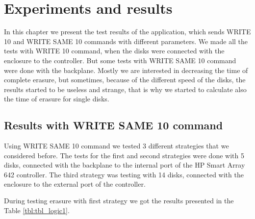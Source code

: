 \chapter{Experiments and results}
\label{chap5:title}

In this chapter we present the test results of the application, which sends WRITE 10 and WRITE SAME 10 commands with different parameters. We made all the tests with WRITE 10 command, when the disks were connected with the enclosure to the controller. But some tests with WRITE SAME 10 command were done with the backplane. Mostly we are interested in decreasing the time of complete erasure, but sometimes, because of the different speed of the disks, the results started to be useless and strange, that is why we started to calculate also the time of erasure for single disks. 

\section{Results with WRITE SAME 10 command}
Using WRITE SAME 10 command we tested 3 different strategies that we considered before. The tests for the first and second strategies were done with 5 disks, connected with the backplane to the internal port of the HP Smart Array 642 controller. The third strategy was testing with 14 disks, connected with the enclosure to the external port of the controller. 

\newpage 
During testing erasure with first strategy we got the results presented in the Table \ref{tbl:tbl_logic1}. 

